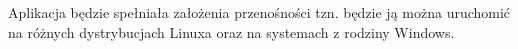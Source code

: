 \documentclass{article}
\begin{document}
Aplikacja będzie spełniała założenia przenośności tzn. będzie ją można uruchomić na różnych dystrybucjach Linuxa oraz na systemach z rodziny Windows.
				

 
  
\end{document}
